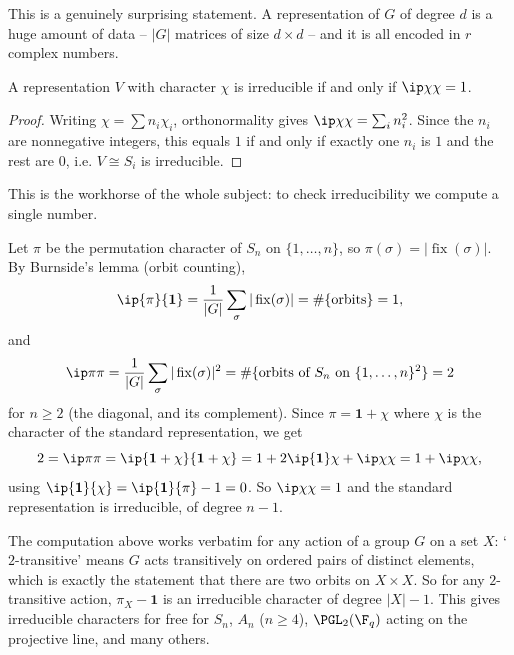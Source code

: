 This is a genuinely surprising statement. A representation of $G$ of degree $d$ is a huge amount of data -- $|G|$ matrices of size $d\times d$ -- and it is all encoded in $r$ complex numbers.

\begin{corollary}
	A representation $V$ with character $\chi$ is irreducible if and only if $\ip\chi\chi = 1$.
\end{corollary}
\begin{proof}
	Writing $\chi = \sum n_i\chi_i$, orthonormality gives $\ip\chi\chi = \sum_i n_i^2$. Since the $n_i$ are nonnegative integers, this equals $1$ if and only if exactly one $n_i$ is $1$ and the rest are $0$, i.e. $V \cong S_i$ is irreducible.
\end{proof}

This is the workhorse of the whole subject: to check irreducibility we compute a single number.

\begin{example}
	Let $\pi$ be the permutation character of $S_n$ on $\{1,\dots,n\}$, so $\pi(\sigma) = |\operatorname{fix}(\sigma)|$. By Burnside's lemma (orbit counting),
	$$\ip{\pi}{\mathbf{1}} = \frac1{|G|}\sum_\sigma |\operatorname{fix}(\sigma)| = \#\{\text{orbits}\} = 1,$$
	and
	$$\ip\pi\pi = \frac1{|G|}\sum_\sigma|\operatorname{fix}(\sigma)|^2 = \#\{\text{orbits of } S_n \text{ on } \{1,\dots,n\}^2\} = 2$$
	for $n \geq 2$ (the diagonal, and its complement). Since $\pi = \mathbf 1 + \chi$ where $\chi$ is the character of the standard representation, we get
	$$2 = \ip\pi\pi = \ip{\mathbf1 + \chi}{\mathbf 1 + \chi} = 1 + 2\ip{\mathbf1}\chi + \ip\chi\chi = 1 + \ip\chi\chi,$$
	using $\ip{\mathbf1}{\chi} = \ip{\mathbf1}{\pi} - 1 = 0$. So $\ip\chi\chi = 1$ and the standard representation is irreducible, of degree $n-1$.
\end{example}

\begin{remark}
	The computation above works verbatim for any  action of a group $G$ on a set $X$: `$2$-transitive' means $G$ acts transitively on ordered pairs of distinct elements, which is exactly the statement that there are two orbits on $X \times X$. So for any $2$-transitive action, $\pi_X - \mathbf 1$ is an irreducible character of degree $|X| - 1$. This gives irreducible characters for free for $S_n$, $A_n$ ($n\geq 4$), $\PGL_2(\F_q)$ acting on the projective line, and many others.
\end{remark}

